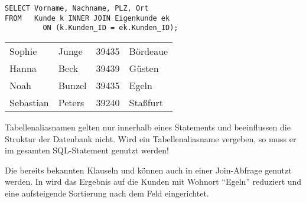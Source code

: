         \begin{lstlisting}[language=oracle_sql,caption={Die Benutzung von Tabellenaliasnamen},label=sql04_04]
SELECT Vorname, Nachname, PLZ, Ort
FROM   Kunde k INNER JOIN Eigenkunde ek
         ON (k.Kunden_ID = ek.Kunden_ID);
        \end{lstlisting}
        \begin{center}
          \begin{small}
            \tablehead{}
            \begin{msoraclesql}
              \begin{supertabular}{llll}
                Sophie & Junge & 39435 & B\"ordeaue \\
                Hanna & Beck & 39439 & G\"usten \\
                Noah & Bunzel & 39435 & Egeln \\
                Sebastian & Peters & 39240 & Sta\ss{}furt \\
              \end{supertabular}
            \end{msoraclesql}
          \end{small}
        \end{center}
        \begin{merke}
          Tabellenaliasnamen gelten nur innerhalb eines Statements und beeinflussen die Struktur der Datenbank nicht. Wird ein Tabellenaliasname vergeben, so muss er im gesamten SQL-Statement genutzt werden!
        \end{merke}
        Die bereits bekannten Klauseln  und  k\"onnen auch in einer Join-Abfrage genutzt werden. In  wird das Ergebnis auf die Kunden mit Wohnort \enquote{Egeln} reduziert und eine aufsteigende Sortierung nach dem Feld  eingerichtet.
